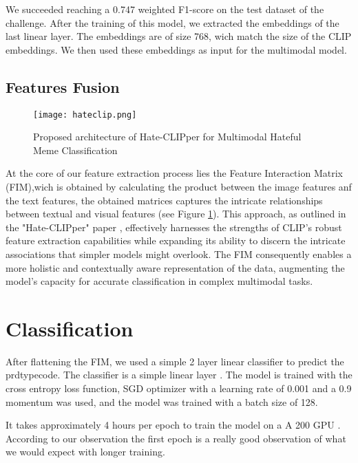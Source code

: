 We succeeded reaching a 0.747 weighted F1-score on the test dataset of the challenge. After the training of this model, we extracted the embeddings of the last linear layer. The embeddings are of size 768, wich match the size of the CLIP embeddings. We then used these embeddings as input for the multimodal model.

\subsection{Features Fusion}

\begin{figure}[H]
    \centering
    \texttt{[image: hateclip.png]}
    \caption{\label{fig:hateclipper} Proposed architecture of Hate-CLIPper for Multimodal Hateful Meme Classification}

\end{figure}

At the core of our feature extraction process lies the Feature Interaction Matrix (FIM),wich is obtained by calculating the product between the image features anf the text features, the obtained matrices captures the intricate relationships between textual and visual features (see Figure \ref{fig:hateclipper}). This approach, as outlined in the "Hate-CLIPper" paper \cite{kumar2022hateclipper}, effectively harnesses the strengths of CLIP's robust feature extraction capabilities while expanding its ability to discern the intricate associations that simpler models might overlook. The FIM consequently enables a more holistic and contextually aware representation of the data, augmenting the model's capacity for accurate classification in complex multimodal tasks.

\section{Classification}

After flattening  the FIM, we used a simple 2 layer linear classifier to predict the prdtypecode. The classifier is a simple linear layer . The model is trained with the cross entropy loss function, SGD optimizer with a learning rate of 0.001 and a 0.9 momentum was used, and the model was trained with a batch size of 128.

It takes approximately 4 hours per epoch to train the model on a A 200 GPU . According to our observation the first epoch is a really good observation of what we would expect with longer training.

